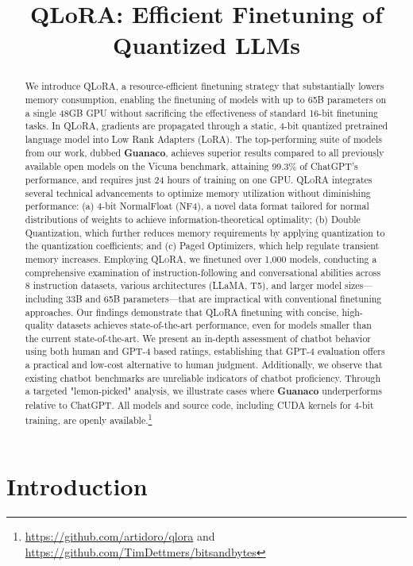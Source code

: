 \title{QLoRA: Efficient Finetuning of Quantized LLMs}

\begin{abstract}
We introduce \textsc{QLoRA}, a resource-efficient finetuning strategy that substantially lowers memory consumption, enabling the finetuning of models with up to 65B parameters on a single 48GB GPU without sacrificing the effectiveness of standard 16-bit finetuning tasks. In \textsc{QLoRA}, gradients are propagated through a static, 4-bit quantized pretrained language model into Low Rank Adapters (LoRA). The top-performing suite of models from our work, dubbed \textbf{Guanaco}, achieves superior results compared to all previously available open models on the Vicuna benchmark, attaining 99.3\% of ChatGPT's performance, and requires just 24 hours of training on one GPU. \textsc{QLoRA} integrates several technical advancements to optimize memory utilization without diminishing performance: (a) 4-bit NormalFloat (NF4), a novel data format tailored for normal distributions of weights to achieve information-theoretical optimality; (b) Double Quantization, which further reduces memory requirements by applying quantization to the quantization coefficients; and (c) Paged Optimizers, which help regulate transient memory increases. Employing \textsc{QLoRA}, we finetuned over 1,000 models, conducting a comprehensive examination of instruction-following and conversational abilities across 8 instruction datasets, various architectures (LLaMA, T5), and larger model sizes—including 33B and 65B parameters—that are impractical with conventional finetuning approaches. Our findings demonstrate that \textsc{QLoRA} finetuning with concise, high-quality datasets achieves state-of-the-art performance, even for models smaller than the current state-of-the-art. We present an in-depth assessment of chatbot behavior using both human and GPT-4 based ratings, establishing that GPT-4 evaluation offers a practical and low-cost alternative to human judgment. Additionally, we observe that existing chatbot benchmarks are unreliable indicators of chatbot proficiency. Through a targeted "lemon-picked" analysis, we illustrate cases where \textbf{Guanaco} underperforms relative to ChatGPT. All models and source code, including CUDA kernels for 4-bit training, are openly available.\footnote{\url{https://github.com/artidoro/qlora} and \url{https://github.com/TimDettmers/bitsandbytes}}
\end{abstract}

\section{Introduction}

